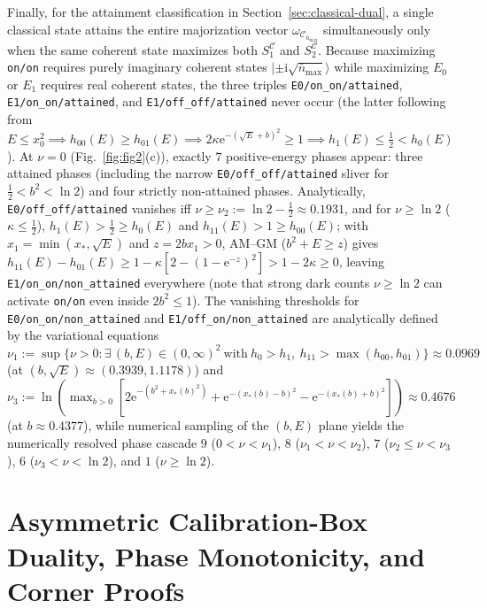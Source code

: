 \documentclass{iopjournal}
\newcommand{\Cset}{\mathcal{C}}
\newcommand{\nbar}{\bar n_{\max}}
\newcommand{\ket}[1]{\lvert #1\rangle}
\newcommand{\ii}{\mathrm{i}}
\newcommand{\ee}{\mathrm{e}}
\begin{document}
Finally, for the attainment classification in Section~\ref{sec:classical-dual}, a single classical state attains the entire majorization vector $\omega_{\Cset_{\nbar}}$ simultaneously only when the same coherent state maximizes both $S_1^{\Cset}$ and $S_2^{\Cset}$. Because maximizing \texttt{on/on} requires purely imaginary coherent states $\ket{\pm\ii\sqrt{\nbar}}$ while maximizing $E_0$ or $E_1$ requires real coherent states, the three triples \texttt{E0/on\_on/attained}, \texttt{E1/on\_on/attained}, and \texttt{E1/off\_off/attained} never occur (the latter following from $E \le x_0^2 \implies h_{00}(E) \ge h_{01}(E) \implies 2\kappa\ee^{-(\sqrt{E}+b)^2} \ge 1 \implies h_1(E) \le \frac{1}{2} < h_0(E)$). At $\nu = 0$ (Fig.~\ref{fig:fig2}(c)), exactly $7$ positive-energy phases appear: three attained phases (including the narrow \texttt{E0/off\_off/attained} sliver for $\frac{1}{2} < b^2 < \ln 2$) and four strictly non-attained phases. Analytically, \texttt{E0/off\_off/attained} vanishes iff $\nu \ge \nu_2 := \ln 2 - \frac{1}{2} \approx 0.1931$, and for $\nu \ge \ln 2$ ($\kappa \le \frac{1}{2}$), $h_1(E) > \frac{1}{2} \ge h_0(E)$ and $h_{11}(E) > 1 \ge h_{00}(E)$; with $x_1 = \min(x_*, \sqrt{E})$ and $z = 2bx_1 > 0$, AM--GM ($b^2+E \ge z$) gives $h_{11}(E) - h_{01}(E) \ge 1 - \kappa[2 - (1-\ee^{-z})^2] > 1 - 2\kappa \ge 0$, leaving \texttt{E1/on\_on/non\_attained} everywhere (note that strong dark counts $\nu \ge \ln 2$ can activate \texttt{on/on} even inside $2b^2 \le 1$). The vanishing thresholds for \texttt{E0/on\_on/non\_attained} and \texttt{E1/off\_on/non\_attained} are analytically defined by the variational equations $\nu_1 := \sup\{\nu > 0 : \exists\,(b,E)\in(0,\infty)^2\ \text{with}\ h_0 > h_1,\ h_{11} > \max(h_{00},h_{01})\} \approx 0.0969$ (at $(b,\sqrt{E}) \approx (0.3939, 1.1178)$) and $\nu_3 := \ln(\max_{b>0}[2\ee^{-(b^2+x_*(b)^2)} + \ee^{-(x_*(b)-b)^2} - \ee^{-(x_*(b)+b)^2}]) \approx 0.4676$ (at $b \approx 0.4377$), while numerical sampling of the $(b,E)$ plane yields the numerically resolved phase cascade $9$ ($0<\nu<\nu_1$), $8$ ($\nu_1<\nu<\nu_2$), $7$ ($\nu_2 \le \nu < \nu_3$), $6$ ($\nu_3 < \nu < \ln 2$), and $1$ ($\nu \ge \ln 2$).

\section{Asymmetric Calibration-Box Duality, Phase Monotonicity, and Corner Proofs}\label{app:calibration}
\end{document}
